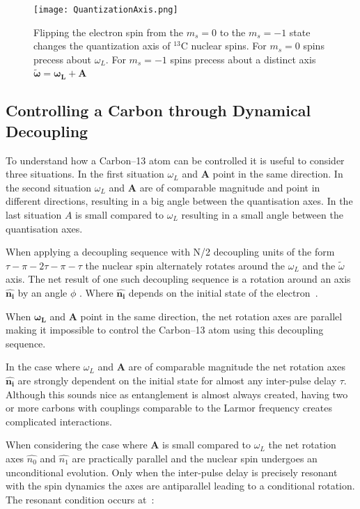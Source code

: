 \begin{figure}[htbp]
\centering
\texttt{[image: QuantizationAxis.png]}
\caption{Flipping the electron spin from the  $m_s=0$ to the $m_s= -1$ state changes the quantization axis of $^{13}\mathrm{C}$ nuclear spins. For  $m_s=0$ spins precess about $\omega_L$. For  $m_s=-1$ spins precess about a distinct axis $\mathbf{\tilde{\omega}}=\mathbf{\omega_L} +\mathbf{A}$~\citep{Taminiau2012} }
\label{fig:quantax}
\end{figure}



\subsection{Controlling a Carbon through Dynamical Decoupling}
\label{controllingacarbonthroughdynamicaldecoupling}

To understand how a Carbon--13 atom can be controlled it is useful to consider three situations. In the first situation $\omega_L$ and $\mathbf{A}$ point in the same direction. In the second situation $\omega_L$ and $\mathbf{A}$ are of comparable magnitude and point in different directions, resulting in a big angle between the quantisation axes. In the last situation $A$ is small compared to  $\omega_L$ resulting in a small angle between the quantisation axes.

When applying a decoupling sequence with N\slash 2 decoupling units of the form \mbox{$\tau - \pi -2\tau-\pi-\tau$} the nuclear spin alternately rotates around the  $\omega_L$ and the $\tilde{\omega}$ axis. The net result of one such decoupling sequence is a rotation around an axis  $\mathbf{\hat{n_i}}$ by an angle $\phi$  . Where  $\mathbf{\hat{n_i}}$  depends on the initial state of the electron~\citep{Taminiau2012}. 

When $\mathbf{\omega_L}$ and $\mathbf{A}$ point in the same direction, the net rotation axes are parallel making it impossible to control the Carbon--13 atom using this decoupling sequence. 

In the case where $\omega_L$ and $\mathbf{A}$ are of comparable magnitude the net rotation axes  $\mathbf{\hat{n_i}}$ are strongly dependent on the initial state for almost any inter-pulse delay $\tau$. Although this sounds nice as entanglement is almost always created, having two or more carbons with couplings comparable to the Larmor frequency creates complicated interactions. 

When considering the case where $\mathbf{A}$ is small compared to  $\omega_L$ the net rotation axes  $\hat{n_0}$ and $\hat{n_1}$ are practically parallel and the nuclear spin undergoes an unconditional evolution. Only when the inter-pulse delay is precisely resonant with the spin dynamics the axes are antiparallel leading to a conditional rotation. The resonant condition occurs at~\citep{Taminiau2012}: 

